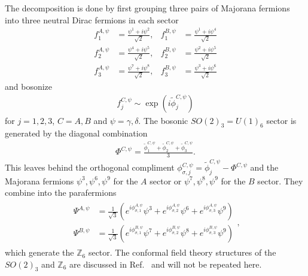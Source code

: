 The decomposition is done by first grouping three pairs of Majorana fermions into three neutral Dirac fermions in each sector \begin{align}f^{A,\psi}_1&=\frac{\psi^1+i\psi^2}{\sqrt{2}},&f^{B,\psi}_1&=\frac{\psi^1+i\psi^4}{\sqrt{2}}\nonumber\\f^{A,\psi}_2&=\frac{\psi^4+i\psi^5}{\sqrt{2}},&f^{B,\psi}_2&=\frac{\psi^2+i\psi^5}{\sqrt{2}}\nonumber\\f^{A,\psi}_3&=\frac{\psi^7+i\psi^8}{\sqrt{2}},&f^{B,\psi}_3&=\frac{\psi^3+i\psi^6}{\sqrt{2}}\nonumber\end{align} and bosonize \begin{align}f^{C,\psi}_j\sim\exp\left(i\tilde\phi^{C,\psi}_j\right)\label{so(3)3bosonization}\end{align} for $j=1,2,3$, $C=A,B$ and $\psi=\gamma,\delta$. The bosonic $SO(2)_3=U(1)_6$ sector is generated by the diagonal combination \begin{align}\Phi^{C,\psi}=\frac{\tilde\phi^{C,\psi}_1+\tilde\phi^{C,\psi}_2+\tilde\phi^{C,\psi}_3}{3}.\end{align} This leaves behind the orthogonal compliment $\phi^{C,\psi}_{\sigma,j}=\tilde\phi^{C,\psi}_j-\Phi^{C,\psi}$ and the Majorana fermions $\psi^3,\psi^6,\psi^9$ for the $A$ sector or $\psi^7,\psi^8,\psi^9$ for the $B$ sector. They combine into the parafermions \begin{align}\begin{split}\Psi^{A,\psi}&=\frac{1}{\sqrt{3}}\left(e^{i\phi_{\sigma,1}^{A,\psi}}\psi^3+e^{i\phi_{\sigma,2}^{A,\psi}}\psi^6+e^{i\phi_{\sigma,3}^{A,\psi}}\psi^9\right)\\\Psi^{B,\psi}&=\frac{1}{\sqrt{3}}\left(e^{i\phi_{\sigma,1}^{B,\psi}}\psi^7+e^{i\phi_{\sigma,2}^{B,\psi}}\psi^8+e^{i\phi_{\sigma,3}^{B,\psi}}\psi^9\right)\end{split},\label{Z6parafermiondefinition}\end{align} which generate the $\mathbb{Z}_6$ sector. The conformal field theory structures of the $SO(2)_3$ and $\mathbb{Z}_6$ are discussed in Ref.~\cite{PhysRevB.94.165142} and will not be repeated here.

